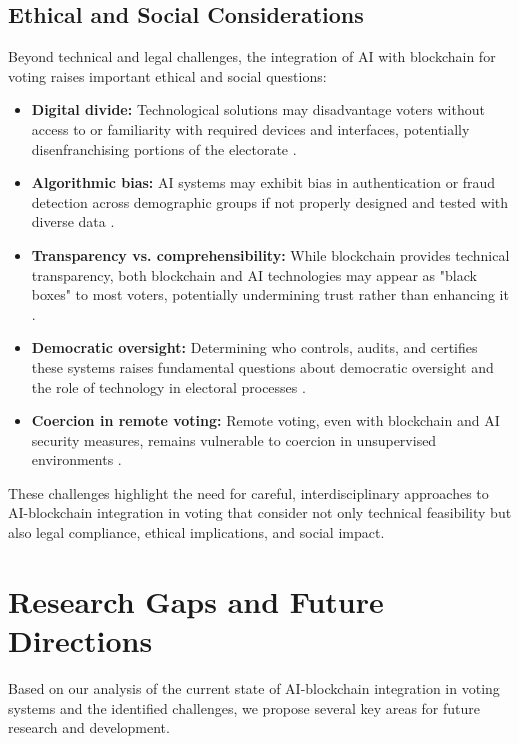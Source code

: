 \documentclass[conference]{IEEEtran}
\begin{document}
\subsection{Ethical and Social Considerations}
Beyond technical and legal challenges, the integration of AI with blockchain for voting raises important ethical and social questions:

\begin{itemize}
    \item \textbf{Digital divide:} Technological solutions may disadvantage voters without access to or familiarity with required devices and interfaces, potentially disenfranchising portions of the electorate \cite{b7}.
    
    \item \textbf{Algorithmic bias:} AI systems may exhibit bias in authentication or fraud detection across demographic groups if not properly designed and tested with diverse data \cite{b11}.
    
    \item \textbf{Transparency vs. comprehensibility:} While blockchain provides technical transparency, both blockchain and AI technologies may appear as "black boxes" to most voters, potentially undermining trust rather than enhancing it \cite{b9}.
    
    \item \textbf{Democratic oversight:} Determining who controls, audits, and certifies these systems raises fundamental questions about democratic oversight and the role of technology in electoral processes \cite{b3}.
    
    \item \textbf{Coercion in remote voting:} Remote voting, even with blockchain and AI security measures, remains vulnerable to coercion in unsupervised environments \cite{b15}.
\end{itemize}

These challenges highlight the need for careful, interdisciplinary approaches to AI-blockchain integration in voting that consider not only technical feasibility but also legal compliance, ethical implications, and social impact.

\section{Research Gaps and Future Directions}
Based on our analysis of the current state of AI-blockchain integration in voting systems and the identified challenges, we propose several key areas for future research and development.
\end{document}
